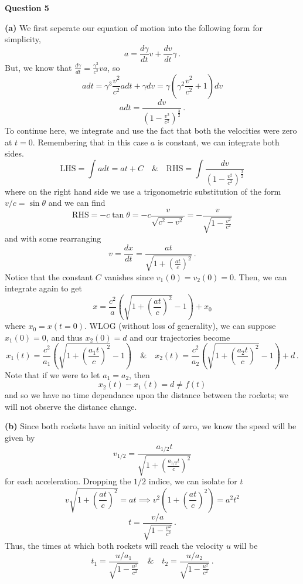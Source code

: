 \documentclass[10pt]{article}
\newcommand{\del}[2][]{\frac{d #1}{d #2}}
\begin{document}
\newpage
\textbf{Question 5}

\textbf{(a)} We first seperate our equation of motion into the following form for simplicity,
\[ a = \del[\gamma]{t}v + \del[v]{t}\gamma \, . \]
But, we know that $\del[\gamma]{t} = \frac{\gamma^{3}}{c^{2}}va$, so
\[ a dt = \gamma^{3}\frac{v^{2}}{c^{2}} a dt + \gamma dv = \gamma\left(\gamma^{2}\frac{v^{2}}{c^{2}} + 1\right)dv \]
\[ a dt = \frac{dv}{\left(1- \frac{v^{2}}{c^{2}}\right)^{\frac{3}{2}}} \, .\]
To continue here, we integrate and use the fact that both the velocities were zero at $t=0$. Remembering that in this case $a$ is constant, we can integrate both sides.
\[ \text{LHS} = \int a dt = at + C \quad \& \quad \text{RHS} = \int \frac{dv}{\left(1 - \frac{v^{2}}{c^{2}}\right)^{\frac{3}{2}}}\]
where on the right hand side we use a trigonometric substitution of the form $v/c = \sin\theta $ and we can find
\[\text{RHS} = -c \tan\theta = -c\frac{v}{\sqrt{c^{2} - v^{2}}} = -\frac{v}{\sqrt{1 - \frac{v^{2}}{c^{2}}}} \]
and with some rearranging
\[ v = \del[x]{t} = \frac{at}{\sqrt{1 + \left(\frac{at}{c}\right)^{2}}} \, .\]
Notice that the constant $C$ vanishes since $v_{1}(0) = v_{2}(0) = 0$. Then, we can integrate again to get
\[ x = \frac{c^{2}}{a}\left(\sqrt{1 + \left(\frac{at}{c}\right)^{2}} - 1\right) + x_{0}\]
where $x_{0} = x(t=0)$. WLOG (without loss of generality), we can suppose $x_{1}(0) = 0$, and thus $x_{2}(0) = d$ and our trajectories become
\[ x_{1}(t) = \frac{c^{2}}{a_{1}}\left(\sqrt{1 + \left(\frac{a_{1}t}{c}\right)^{2}} - 1\right) \quad \& \quad x_{2}(t) = \frac{c^{2}}{a_{2}}\left(\sqrt{1 + \left(\frac{a_{2}t}{c}\right)^{2}} - 1\right) + d\, .\]
Note that if we were to let $a_{1} = a_{2}$, then
\[ x_{2}(t) - x_{1}(t) = d \neq f(t) \]
and so we have no time dependance upon the distance between the rockets; we will not observe the distance change.

\textbf{(b)} Since both rockets have an initial velocity of zero, we know the speed will be given by
\[ v_{1/2} = \frac{a_{1/2}t}{\sqrt{1 + \left(\frac{a_{1/2}t}{c}\right)^{2}}} \]
for each acceleration. Dropping the $1/2$ indice, we can isolate for $t$
\[ v\sqrt{1 + \left(\frac{at}{c}\right)^{2}} = at \implies v^{2}\left(1 + \left(\frac{at}{c}\right)^{2}\right) = a^{2}t^{2}\]
\[ t = \frac{v/a}{\sqrt{1 - \frac{v^{2}}{c^{2}}}} \, .\]
Thus, the times at which both rockets will reach the velocity $u$ will be
\[ t_{1} = \frac{u/a_{1}}{\sqrt{1 - \frac{u^{2}}{c^{2}}}} \quad \& \quad t_{2} = \frac{u/a_{2}}{\sqrt{1 - \frac{u^{2}}{c^{2}}}} \, . \]
\end{document}
